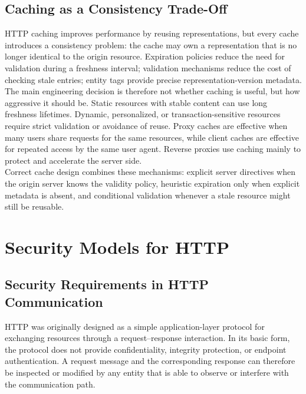 \documentclass{scrbook}
\begin{document}
\section{Caching as a Consistency Trade-Off}

HTTP caching improves performance by reusing representations, but every cache introduces a consistency problem: the cache may own a representation that is no longer identical to the origin resource. Expiration policies reduce the need for validation during a freshness interval; validation mechanisms reduce the cost of checking stale entries; entity tags provide precise representation-version metadata.\\

The main engineering decision is therefore not whether caching is useful, but how aggressive it should be. Static resources with stable content can use long freshness lifetimes. Dynamic, personalized, or transaction-sensitive resources require strict validation or avoidance of reuse. Proxy caches are effective when many users share requests for the same resources, while client caches are effective for repeated access by the same user agent. Reverse proxies use caching mainly to protect and accelerate the server side.\\

Correct cache design combines these mechanisms: explicit server directives when the origin server knows the validity policy, heuristic expiration only when explicit metadata is absent, and conditional validation whenever a stale resource might still be reusable.

\chapter{Security Models for HTTP}

\section{Security Requirements in HTTP Communication}

HTTP was originally designed as a simple application-layer protocol for exchanging resources through a request--response interaction. In its basic form, the protocol does not provide confidentiality, integrity protection, or endpoint authentication. A request message and the corresponding response can therefore be inspected or modified by any entity that is able to observe or interfere with the communication path.\\
\end{document}
